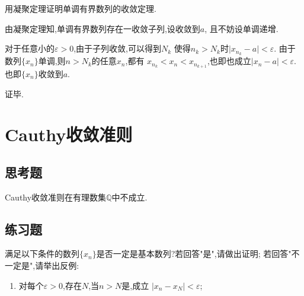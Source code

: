 \documentclass[cn]{elegantbook}
\begin{document}
            \begin{exercise}
                用凝聚定理证明单调有界数列的收敛定理.
            \end{exercise}
            \begin{solution}
                由凝聚定理知,单调有界数列存在一收敛子列,设收敛到$a$,
                且不妨设单调递增.

                对于任意小的$\varepsilon>0$,由于子列收敛,可以得到$N_k$
                使得$n_k>N_k$时$\lvert x_{n_k}-a\rvert<\varepsilon$.
                由于数列$\{x_n\}$单调,则$n>N_k$的任意$x_n$,都有
                $x_{n_k}<x_n<x_{n_{k+1}}$,也即也成立$\lvert x_n-a\rvert<\varepsilon$.
                也即$\{x_n\}$收敛到$a$.

                证毕.
            \end{solution}
    
    \section{Cauthy收敛准则}
        \subsection{思考题}
            \begin{example}
                Cauthy收敛准则在有理数集$\mathbb{Q}$中不成立.
            \end{example}
            \begin{solution}
                
            \end{solution}
        
            \subsection{练习题}
            \begin{exercise}
                满足以下条件的数列$\{x_n\}$是否一定是基本数列?若回答"是",请做出证明;
                若回答"不一定是",请举出反例:
                \begin{enumerate}
                    \item 对每个$\varepsilon>0$,存在$N$,当$n>N$是,成立
                    $\lvert x_n-x_N\rvert<\varepsilon$;
                \end{enumerate}
            \end{exercise}
\end{document}
